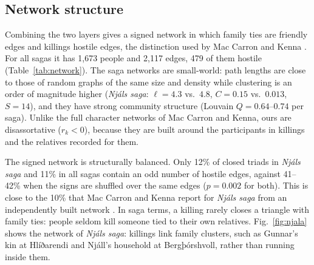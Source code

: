 \documentclass[9pt,twocolumn,twoside]{pnas-new}
\begin{document}
\subsection*{Network structure}
Combining the two layers gives a signed network in which family ties are friendly edges and killings hostile edges, the distinction used by Mac Carron and Kenna \cite{maccarron2013}. For all sagas it has 1{,}673 people and 2{,}117 edges, 479 of them hostile (Table~\ref{tab:network}). The saga networks are small-world: path lengths are close to those of random graphs of the same size and density while clustering is an order of magnitude higher (\textit{Njáls saga}: $\ell=4.3$ vs.\ $4.8$, $C=0.15$ vs.\ $0.013$, $S=14$), and they have strong community structure (Louvain $Q=0.64$--$0.74$ per saga). Unlike the full character networks of Mac Carron and Kenna, ours are disassortative ($r_k<0$), because they are built around the participants in killings and the relatives recorded for them.

The signed network is structurally balanced. Only 12\% of closed triads in \textit{Njáls saga} and 11\% in all sagas contain an odd number of hostile edges, against 41--42\% when the signs are shuffled over the same edges ($p=0.002$ for both). This is close to the 10\% that Mac Carron and Kenna report for \textit{Njáls saga} from an independently built network \cite{maccarron2013}. In saga terms, a killing rarely closes a triangle with family ties: people seldom kill someone tied to their own relatives. Fig.~\ref{fig:njala} shows the network of \textit{Njáls saga}: killings link family clusters, such as Gunnar's kin at Hlíðarendi and Njáll's household at Bergþórshvoll, rather than running inside them.
\end{document}

